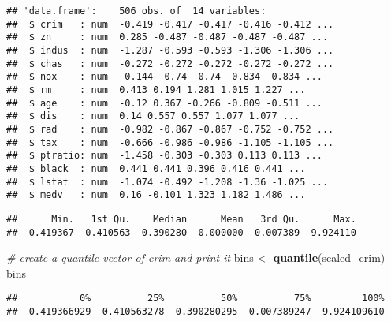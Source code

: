 \documentclass[
]{article}
\newenvironment{Shaded}{\begin{snugshade}}{\end{snugshade}}
\newcommand{\CommentTok}[1]{\textcolor[rgb]{0.56,0.35,0.01}{\textit{#1}}}
\newcommand{\KeywordTok}[1]{\textcolor[rgb]{0.13,0.29,0.53}{\textbf{#1}}}
\newcommand{\NormalTok}[1]{#1}
\newcommand{\OperatorTok}[1]{\textcolor[rgb]{0.81,0.36,0.00}{\textbf{#1}}}
\newcommand{\StringTok}[1]{\textcolor[rgb]{0.31,0.60,0.02}{#1}}
\begin{document}
\begin{verbatim}
## 'data.frame':    506 obs. of  14 variables:
##  $ crim   : num  -0.419 -0.417 -0.417 -0.416 -0.412 ...
##  $ zn     : num  0.285 -0.487 -0.487 -0.487 -0.487 ...
##  $ indus  : num  -1.287 -0.593 -0.593 -1.306 -1.306 ...
##  $ chas   : num  -0.272 -0.272 -0.272 -0.272 -0.272 ...
##  $ nox    : num  -0.144 -0.74 -0.74 -0.834 -0.834 ...
##  $ rm     : num  0.413 0.194 1.281 1.015 1.227 ...
##  $ age    : num  -0.12 0.367 -0.266 -0.809 -0.511 ...
##  $ dis    : num  0.14 0.557 0.557 1.077 1.077 ...
##  $ rad    : num  -0.982 -0.867 -0.867 -0.752 -0.752 ...
##  $ tax    : num  -0.666 -0.986 -0.986 -1.105 -1.105 ...
##  $ ptratio: num  -1.458 -0.303 -0.303 0.113 0.113 ...
##  $ black  : num  0.441 0.441 0.396 0.416 0.441 ...
##  $ lstat  : num  -1.074 -0.492 -1.208 -1.36 -1.025 ...
##  $ medv   : num  0.16 -0.101 1.323 1.182 1.486 ...
\end{verbatim}

\begin{Shaded}
\end{Shaded}

\begin{verbatim}
##      Min.   1st Qu.    Median      Mean   3rd Qu.      Max. 
## -0.419367 -0.410563 -0.390280  0.000000  0.007389  9.924110
\end{verbatim}

\begin{Shaded}
\begin{Highlighting}[]
\CommentTok{# create a quantile vector of crim and print it}
\NormalTok{bins <-}\StringTok{ }\KeywordTok{quantile}\NormalTok{(scaled_crim)}
\NormalTok{bins}
\end{Highlighting}
\end{Shaded}

\begin{verbatim}
##           0%          25%          50%          75%         100% 
## -0.419366929 -0.410563278 -0.390280295  0.007389247  9.924109610
\end{verbatim}
\end{document}
